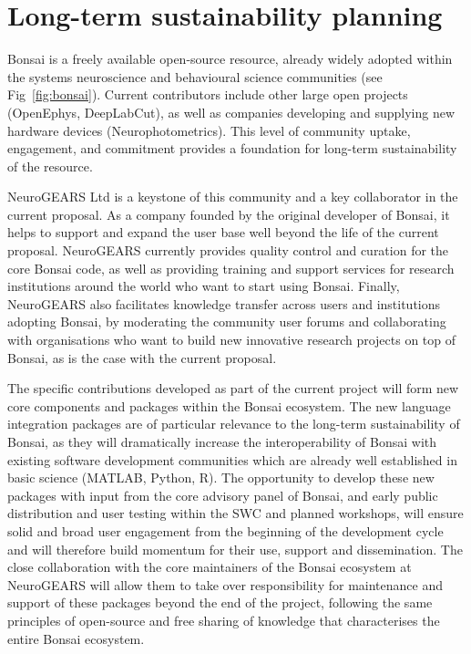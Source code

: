 
\section{Long-term sustainability planning}

Bonsai is a freely available open-source resource, already widely adopted within
the systems neuroscience and behavioural science communities (see Fig~\ref{fig:bonsai}).  
%
Current contributors include other large open projects (OpenEphys, DeepLabCut),
as well as companies developing and supplying new hardware devices  (Neurophotometrics).
%
This level of community uptake, engagement, and commitment provides a foundation for
long-term sustainability of the resource.

NeuroGEARS Ltd is a keystone of this community and a key collaborator in the current proposal.
As a company founded by the original developer of Bonsai, it helps to support and expand the
user base well beyond the life of the current proposal. NeuroGEARS currently provides
quality control and curation for the core Bonsai code, as well as providing training and support
services for research institutions around the world who want to start using Bonsai.
Finally, NeuroGEARS also facilitates knowledge transfer across users and institutions adopting
Bonsai, by moderating the community user forums and collaborating with organisations
who want to build new innovative research projects on top of Bonsai, as is the case with the
current proposal.

The specific contributions developed as part of the current project will form new core
components and packages within the Bonsai ecosystem. The new language integration packages are
of particular relevance to the long-term sustainability of Bonsai, as they will dramatically
increase the interoperability of Bonsai with existing software development communities which are
already well established in basic science (MATLAB, Python, R).
%
The opportunity to develop these new packages with input from the core advisory panel of Bonsai,
and early public distribution and user testing within the SWC and planned workshops, will ensure
solid and broad user engagement from the beginning of the development cycle and will therefore
build momentum for their use, support and dissemination.
%
The close collaboration with the core maintainers of the Bonsai ecosystem at NeuroGEARS will
allow them to take over responsibility for maintenance and support of these packages beyond the
end of the project, following the same principles of open-source and free sharing of knowledge
that characterises the entire Bonsai ecosystem.

